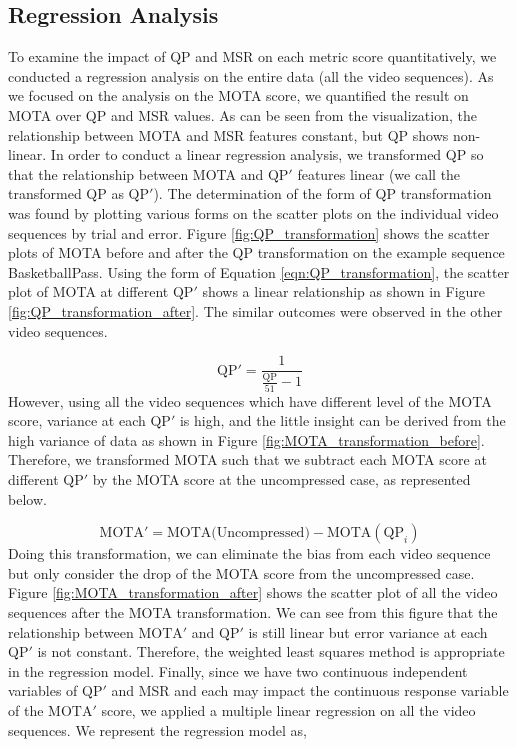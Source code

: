 \subsection{Regression Analysis}
\label{subsec:/results/section_a/regression_analysis}
To examine the impact of QP and MSR on each metric score quantitatively, we conducted a regression analysis on the entire data (all the video sequences). As we focused on the analysis on the MOTA score, we quantified the result on MOTA over QP and MSR values. As can be seen from the visualization, the relationship between MOTA and MSR features constant, but QP shows non-linear. In order to conduct a linear regression analysis, we transformed QP so that the relationship between MOTA and $\text{QP}'$ features linear (we call the transformed QP as $\text{QP}'$). The determination of the form of QP transformation was found by plotting various forms on the scatter plots on the individual video sequences by trial and error. Figure \ref{fig:QP_transformation} shows the scatter plots of MOTA before and after the QP transformation on the example sequence BasketballPass. Using the form of Equation \eqref{eqn:QP_transformation}, the scatter plot of MOTA at different $\text{QP}'$ shows a linear relationship as shown in Figure \ref{fig:QP_transformation_after}. The similar outcomes were observed in the other video sequences.

\begin{equation}
\text{QP}' =  \frac{1}{\frac{\text{QP}}{51}-1}
\label{eqn:QP_transformation}
\end{equation}
However, using all the video sequences which have different level of the MOTA score, variance at each $\text{QP}'$ is high, and the little insight can be derived from the high variance of data as shown in Figure \ref{fig:MOTA_transformation_before}. Therefore, we transformed MOTA such that we subtract each MOTA score at different $\text{QP}'$ by the MOTA score at the uncompressed case, as represented below.

\begin{equation}
\text{MOTA}' = \text{MOTA(Uncompressed)} -  \text{MOTA}(\text{QP}_i)
\label{eqn:MOTA_transformation}
\end{equation}
Doing this transformation, we can eliminate the bias from each video sequence but only consider the drop of the MOTA score from the uncompressed case. Figure \ref{fig:MOTA_transformation_after} shows the scatter plot of all the video sequences after the MOTA transformation. We can see from this figure that the relationship between $\text{MOTA}'$ and $\text{QP}'$ is still linear but error variance at each $\text{QP}'$ is not constant. Therefore, the weighted least squares method is appropriate in the regression model. Finally, since we have two continuous independent variables of $\text{QP}'$ and MSR and each may impact the continuous response variable of the $\text{MOTA}'$ score, we applied a multiple linear regression on all the video sequences. We represent the regression model as,
